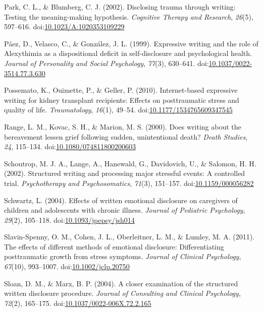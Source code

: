 \documentclass[english,man]{apa6}
\theoremstyle{definition}
\theoremstyle{definition}
\theoremstyle{definition}
\theoremstyle{remark}
\begin{document}
\hypertarget{ref-Park2002}{}
Park, C. L., \& Blumberg, C. J. (2002). Disclosing trauma through
writing: Testing the meaning-making hypothesis. \emph{Cognitive Therapy
and Research}, \emph{26}(5), 597--616.
doi:\href{https://doi.org/10.1023/A:1020353109229}{10.1023/A:1020353109229}

\hypertarget{ref-Paez1999}{}
Páez, D., Velasco, C., \& González, J. L. (1999). Expressive writing and
the role of Alexythimia as a dispositional deficit in self-disclosure
and psychological health. \emph{Journal of Personality and Social
Psychology}, \emph{77}(3), 630--641.
doi:\href{https://doi.org/10.1037/0022-3514.77.3.630}{10.1037/0022-3514.77.3.630}

\hypertarget{ref-Possemato2010}{}
Possemato, K., Ouimette, P., \& Geller, P. (2010). Internet-based
expressive writing for kidney transplant recipients: Effects on
posttraumatic stress and quality of life. \emph{Traumatology},
\emph{16}(1), 49--54.
doi:\href{https://doi.org/10.1177/1534765609347545}{10.1177/1534765609347545}

\hypertarget{ref-Range2000}{}
Range, L. M., Kovac, S. H., \& Marion, M. S. (2000). Does writing about
the bereavement lessen grief following sudden, unintentional death?
\emph{Death Studies}, \emph{24}, 115--134.
doi:\href{https://doi.org/10.1080/074811800200603}{10.1080/074811800200603}

\hypertarget{ref-Schoutrop2002}{}
Schoutrop, M. J. A., Lange, A., Hanewald, G., Davidovich, U., \&
Salomon, H. H. (2002). Structured writing and processing major stressful
events: A controlled trial. \emph{Psychotherapy and Psychosomatics},
\emph{71}(3), 151--157.
doi:\href{https://doi.org/10.1159/000056282}{10.1159/000056282}

\hypertarget{ref-Schwartz2004}{}
Schwartz, L. (2004). Effects of written emotional disclosure on
caregivers of children and adolescents with chronic illness.
\emph{Journal of Pediatric Psychology}, \emph{29}(2), 105--118.
doi:\href{https://doi.org/10.1093/jpepsy/jsh014}{10.1093/jpepsy/jsh014}

\hypertarget{ref-Slavin-Spenny2011}{}
Slavin-Spenny, O. M., Cohen, J. L., Oberleitner, L. M., \& Lumley, M. A.
(2011). The effects of different methods of emotional disclosure:
Differentiating posttraumatic growth from stress symptoms. \emph{Journal
of Clinical Psychology}, \emph{67}(10), 993--1007.
doi:\href{https://doi.org/10.1002/jclp.20750}{10.1002/jclp.20750}

\hypertarget{ref-Sloan2004}{}
Sloan, D. M., \& Marx, B. P. (2004). A closer examination of the
structured written disclosure procedure. \emph{Journal of Consulting and
Clinical Psychology}, \emph{72}(2), 165--175.
doi:\href{https://doi.org/10.1037/0022-006X.72.2.165}{10.1037/0022-006X.72.2.165}
\end{document}
